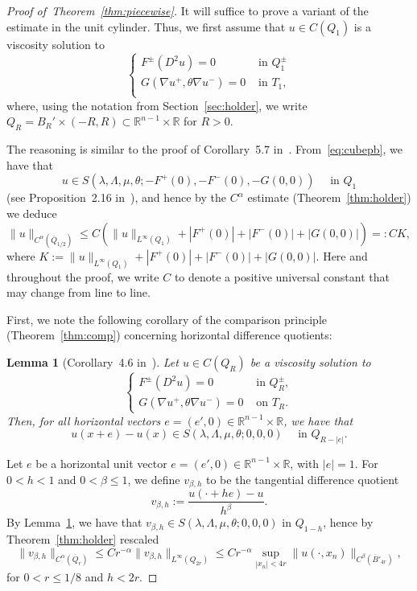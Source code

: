 \documentclass[letter,11pt]{amsart}
\newcommand{\R}{\mathbb{R}}
\newtheorem{lem}[thm]{Lemma}
\theoremstyle{definition}
\numberwithin{equation}{section}
\begin{document}
\begin{proof}[Proof of~Theorem~\ref{thm:piecewise}]
It will suffice to prove a variant of the estimate in the unit cylinder.
Thus, we first assume that $u \in C(Q_1)$ is a viscosity solution to
\begin{equation}
\label{eq:cubepb}
\begin{cases}
F^{\pm}(D^2 u) = 0 & \text{ in } Q_1^{\pm}\\
G(\nabla u^{+}, \theta \nabla u^{-}) = 0 & \text{ in } T_1,\\
\end{cases}
\end{equation}
where, using the notation from Section~\ref{sec:holder}, we write $Q_R = B_R' \times (-R, R) \subset \R^{n-1} \times \R$ for $R > 0$.

\medskip

The reasoning is similar to the proof of Corollary~5.7 in~\cite{CC}.
From~\eqref{eq:cubepb}, we have that
\[
u \in S(\lambda, \Lambda, \mu, \theta; - F^{+}(0),- F^{-}(0),- G(0,0)) \quad \text{ in } Q_1
\]
(see Proposition~2.16 in~\cite{E}), and hence by the $C^{\alpha}$ estimate (Theorem~\ref{thm:holder}) we deduce
\begin{equation}
\label{eq:har}
\|u\|_{C^{\alpha}(\overline{Q}_{1/2})} \leq C \left(\|u\|_{L^{\infty}(Q_1)} + |F^{+}(0)| + |F^{-}(0)| + |G(0,0)| \right) =: C K,
\end{equation}
where $K := \|u\|_{L^{\infty}(Q_1)} + |F^{+}(0)| + |F^{-}(0)| + |G(0,0)|$.
Here and throughout the proof, we write $C$ to denote a positive universal constant that may change from line to line.

\medskip
First, we note the following corollary of the comparison principle (Theorem~\ref{thm:comp}) concerning horizontal difference quotients:
\begin{lem}[Corollary~4.6 in~\cite{E}]
\label{lem:diff}
Let $u \in C(Q_R)$ be a viscosity solution to
\[
\begin{cases}
F^{\pm}(D^2 u) = 0 & \text{ in } Q^{\pm}_R,\\
G(\nabla u^{+}, \theta \nabla u^{-}) = 0 & \text{ on } T_R.
\end{cases}
\]
Then, for all horizontal vectors $e =(e', 0) \in \R^{n-1} \times \R$, we have that
\[
u(x + e) - u(x) \in S(\lambda,\Lambda,\mu,\theta; 0,0, 0) \quad \text{ in } Q_{R-|e|}.
\]
\end{lem}

\medskip

Let $e$ be a horizontal unit vector $e = (e',0) \in \R^{n-1}\times \R$, with $|e| =1$.
For $0 < h < 1$ and $0 < \beta \leq 1$, we define $v_{\beta, h}$ to be the tangential difference quotient
\[
v_{\beta, h} :=
\frac{u(\cdot + h e) - u}{h^{\beta}}.
\]
By Lemma~\ref{lem:diff}, we have that $v_{\beta, h} \in S(\lambda, \Lambda, \mu, \theta; 0,0,0)$ in $Q_{1- h}$, hence by Theorem~\ref{thm:holder} rescaled
\begin{equation}
\label{eq:har2}
\|v_{\beta,h}\|_{C^{\alpha}(\overline{Q}_r)} \leq C r^{-\alpha} \|v_{\beta,h}\|_{L^{\infty}(Q_{2r})} 
\leq C r^{-\alpha} \sup_{|x_n| < 4 r} \|u(\cdot, x_n)\|_{C^{\beta}(\overline{B}'_{4r})},
\end{equation}
for $0 < r \leq 1/8$ and $h < 2r$.


\end{proof}
\end{document}
